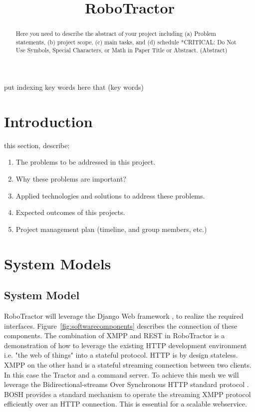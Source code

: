 \documentclass[conference,12pt]{IEEEtran}
\begin{document}
%
\title{RoboTractor}
\author{
\and
{}
\and
{}
}
\maketitle


\begin{abstract}
    Here you need to describe the abstract of your project including (a) Problem statements, (b) project scope, (c) main tasks, and (d) schedule  *CRITICAL:  Do Not Use Symbols, Special Characters, or Math in Paper Title or Abstract. (Abstract)
\end{abstract}

\begin{IEEEkeywords}
    put indexing key words here that  (key words)
\end{IEEEkeywords}

\section{Introduction}
  this section, describe:
\begin{enumerate}
    \item The problems to be addressed in this project.
    \item Why these problems are important?
    \item Applied technologies and solutions to address these problems.
    \item Expected outcomes of this projects.
    \item Project management plan (timeline, and group members, etc.)
\end{enumerate}
\section{System Models}

\subsection{System Model}
RoboTractor will leverage the Django Web framework \autocite{_django_2014}
, to realize the required
interfaces.  Figure~\ref{fig:softwarecomponents} describes the connection of
these components.  The combination of XMPP and REST in RoboTractor is
a demonstration of how to leverage the existing HTTP development environment
i.e. "the web of things" into a stateful protocol. HTTP is by design
stateless. XMPP on the other hand is a stateful streaming connection between two
clients. In this case the Tractor and a command server.  To achieve this mesh we
will leverage the Bidirectional-streams Over Synchronous HTTP standard
protocol \autocite{paterson_bidirectional-streams_2010}. BOSH provides
a standard mechanism to operate the streaming XMPP protocol efficiently over an
HTTP connection. This is essential for a scalable webservice. 
\end{document}
